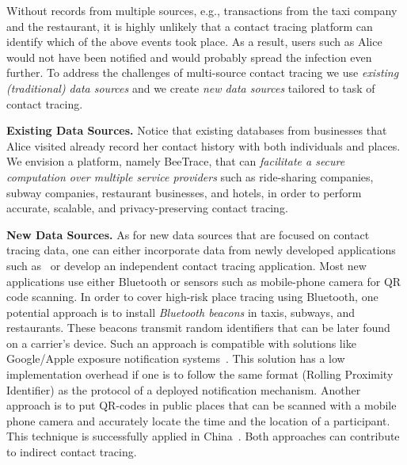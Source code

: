 \documentclass[11pt]{article}  %
\newcommand{\sysname}{\textsf{BeeTrace}\xspace}
\begin{document}
Without records from multiple sources, e.g., transactions from the taxi company and the restaurant, it is highly unlikely that a contact tracing platform can identify which of the above events took place. As a result, users such as  Alice would not have been notified and would probably spread the infection even further. 
To address the challenges of multi-source contact tracing we use \emph{existing (traditional) data sources} and we create \emph{new data sources} tailored to task of contact tracing. 

\textbf{Existing Data Sources.} 
Notice that existing databases from businesses that Alice visited already record her contact history with both individuals and places. We envision a platform, namely \sysname, that can \emph{facilitate a secure computation over multiple service providers} such as ride-sharing companies, subway companies, restaurant businesses, and hotels, in order to perform accurate, scalable, and privacy-preserving contact tracing. 


\textbf{New Data Sources.} As for new data sources that are focused on contact tracing data, one  can either incorporate data from newly developed applications such as~\cite{apple-google-ppct} or develop an independent contact tracing application.  
Most new applications use either Bluetooth or sensors such as mobile-phone camera for QR code scanning. 
In order to cover high-risk place tracing using Bluetooth, one potential approach is to install \emph{Bluetooth beacons} in taxis, subways, and restaurants. These beacons transmit random identifiers that can be later found on a carrier's device. 
Such an approach is compatible with solutions like Google/Apple exposure notification systems~\cite{apple-google-ppct}. This solution has a low implementation overhead if one is to follow the same format (Rolling Proximity Identifier) as the protocol of a deployed notification mechanism. Another approach is to put QR-codes in public places that can be scanned with a mobile phone camera and accurately locate the time and the location of a participant.  
This technique is successfully applied in China~\cite{China-qrcode}. Both approaches can contribute to indirect contact tracing.
\end{document}
